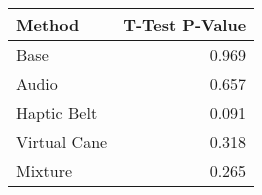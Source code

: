 
\centering
\begin{tabular}{lr}
\toprule
      Method &  T-Test P-Value \\
\midrule
        Base &           0.969 \\
       Audio &           0.657 \\
 Haptic Belt &           0.091 \\
Virtual Cane &           0.318 \\
     Mixture &           0.265 \\
\bottomrule
\end{tabular}
